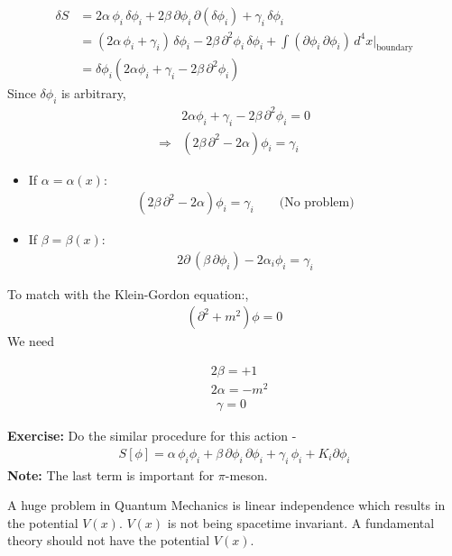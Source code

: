 \documentclass[14pt]{article} %
\begin{document}
\begin{align*}
\delta S &= 2\alpha\, \phi_i\, \delta \phi_i + 2\beta \, \partial \phi_i \, \partial(\delta \phi_i) + \gamma_i \,\delta \phi_i \\
&= (2\alpha \,\phi_i + \gamma_i)\,\delta \phi_i - 2\beta \, \partial^2 \phi_i \, \delta \phi_i + \int (\partial \phi_i \, \partial \phi_i) \, d^4x \bigg|_{\text{boundary}} \\
&= \delta \phi_i \left( 2\alpha \phi_i + \gamma_i - 2\beta \, \partial^2 \phi_i \right)
\end{align*}
Since $\delta \phi_i$ is arbitrary,
\begin{align*}
& 2\alpha \phi_i + \gamma_i - 2\beta \, \partial^2 \phi_i = 0 \\
\Rightarrow & (2\beta \, \partial^2 - 2\alpha) \phi_i = \gamma_i
\end{align*}
\begin{itemize}
\item If $\alpha = \alpha(x)$:
\begin{align*}
(2\beta \, \partial^2 - 2\alpha) \phi_i = \gamma_i
\quad \quad \text{(No problem)}\end{align*}
\item If $\beta = \beta(x)$:
\begin{align*}
2 \partial\,(\beta \, \partial \phi_i) - 2\alpha_i \phi_i = \gamma_i
\end{align*}
\end{itemize} 
To match with the Klein-Gordon equation:,
\begin{align*}
(\partial^2 + m^2)\phi = 0
\end{align*}
We need

\begin{align*}
    & 2\beta = +1 \\
    & 2\alpha = -m^2 \\
    & ~~\gamma = 0
\end{align*}
\begin{framed}
\textbf{Exercise:} Do the similar procedure for this action -
\begin{align*}
S[\phi] = \alpha\, \phi_i \phi_i + \beta\, \partial \phi_i \, \partial \phi_i + \gamma_i\, \phi_i + K_i \partial \phi_i
\end{align*}
\textbf{Note:} The last term is important for $\pi$-meson.
\end{framed}
\begin{tcolorbox}[ title=Note]
A huge problem in Quantum Mechanics is linear independence which results in the potential \( V(x)\). $V(x)$ is not being spacetime invariant. A fundamental theory should not have the potential \( V(x) \).
\end{tcolorbox}
\end{document}
